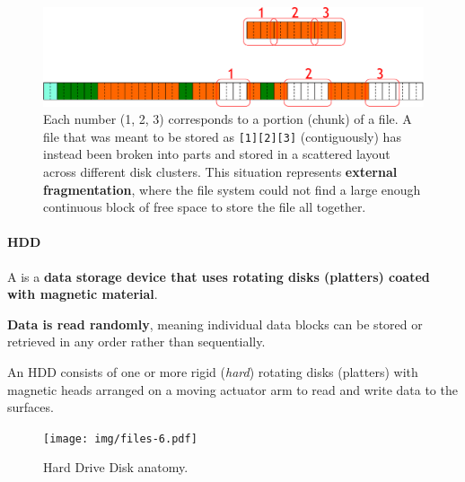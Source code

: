 \begin{itemize}
    \newpage

    \begin{figure}[!htp]
        \centering
        \includegraphics[width=\textwidth]{img/files-5.pdf}
        \caption{Each number (1, 2, 3) corresponds to a portion (chunk) of a file. A file that was meant to be stored as \texttt{[1][2][3]} (contiguously) has instead been broken into parts and stored in a scattered layout across different disk clusters. This situation represents \textbf{external fragmentation}, where the file system could not find a large enough continuous block of free space to store the file all together.}
    \end{figure}
\end{itemize}

\newpage

\paragraph{HDD}\label{paragraph: HDD}

A  is a \textbf{data storage device that uses rotating disks (platters) coated with magnetic material}.

\highspace
\textbf{Data is read randomly}, meaning individual data blocks can be stored or retrieved in any order rather than sequentially.

\highspace
An HDD consists of one or more rigid (\emph{hard}) rotating disks (platters) with magnetic heads arranged on a moving actuator arm to read and write data to the surfaces.

\begin{figure}[!htp]
    \centering
    \texttt{[image: img/files-6.pdf]}
    \caption{Hard Drive Disk anatomy.}
\end{figure}

